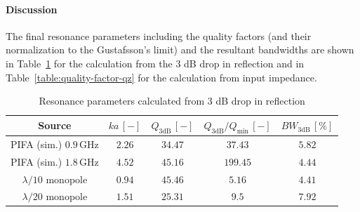 \documentclass[11pt,a4paper]{article}
\begin{document}
\newpage
            \paragraph{Discussion} The final resonance parameters including the quality factors (and their normalization to the Gustafsson's limit) and the resultant bandwidths are shown in Table~\ref{table:quality-factor-q3db} for the calculation from the 3 dB drop in reflection and in Table~\ref{table:quality-factor-qz} for the calculation from input impedance.
            \begin{table}[!ht]
                \centering
                \begin{tabular}{|c||c|c|c|c|}
                    \hline
                    Source & $ka\, [-]$ & $Q_{3\mathrm{dB}}\, [-]$ & $Q_{3\mathrm{dB}}/Q_{\mathrm{min}}\, [-]$ & $\mathit{BW}_{3\mathrm{dB}}\,[\%]$\\
                    \hline\hline
                    \makecell{PIFA (sim.)\\$0.9\, \mathrm{GHz}$} & $2.26$ & $34.47$ & $37.43$ & $5.82$\\
                    \hline
                    \makecell{PIFA (sim.)\\$1.8\, \mathrm{GHz}$} & $4.52$ & $45.16$ & $199.45$ & $4.44$\\
                    \hline
                    \makecell{$\lambda/10$\\monopole} & $0.94$ & $45.46$ & $5.16$ & $4.41$\\
                    \hline
                    \makecell{$\lambda/20$\\monopole} & $1.51$ & $25.31$ & $9.5$ & $7.92$\\
                    \hline
                \end{tabular}
                \caption{\label{table:quality-factor-q3db}Resonance parameters calculated from 3 dB drop in reflection}
            \end{table}
\end{document}
